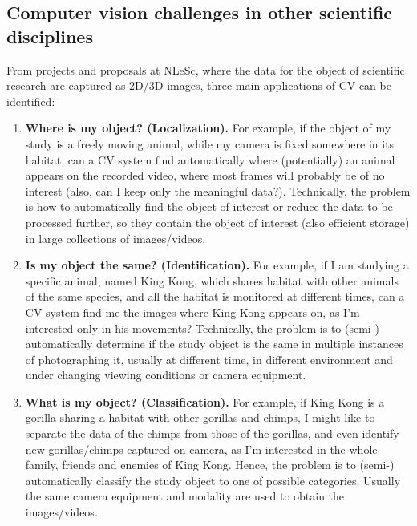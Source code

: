 \subsection{Computer vision challenges in other scientific disciplines}
From projects and proposals at NLeSc, where the data for the object of scientific research are captured as 2D/3D images, three main applications of CV can be identified:
\begin{enumerate}
\item {\bf Where is my object? (Localization).} For example, if the object of my study is a freely moving animal, while my camera is fixed somewhere in its habitat, can a CV system find automatically where (potentially) an animal appears on the recorded video, where most frames will probably be of no interest (also, can I keep only the meaningful data?). Technically, the problem is how to automatically find the object of interest or reduce the data to be processed further, so they contain the object of interest (also efficient storage) in large collections of images/videos.
\item {\bf Is my object the same? (Identification).} For example, if I am studying a specific animal, named King Kong, which shares habitat with other animals of the same species, and all the habitat is monitored at different times, can a CV system find me the images where King Kong appears on, as I'm interested only in his movements? Technically, the problem is to (semi-) automatically determine if the study object is the same in multiple instances of photographing it, usually at different time, in different environment and under changing viewing conditions or camera equipment.
\item {\bf What is my object? (Classification).} For example, if King Kong is a gorilla sharing a habitat with other gorillas and chimps, I might like to separate the data of the chimps from those of the gorillas, and even identify new gorillas/chimps captured on camera, as I'm interested in the whole family, friends and enemies of King Kong. Hence, the problem is to (semi-) automatically classify the study object to one of possible categories. Usually the same camera equipment and modality are used to obtain the images/videos.
\end{enumerate}

